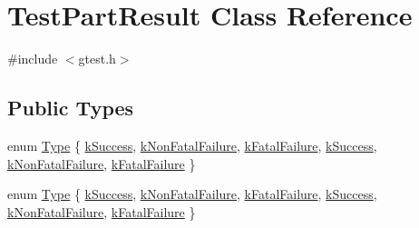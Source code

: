 \hypertarget{classtesting_1_1TestPartResult}{\section{\-Test\-Part\-Result \-Class \-Reference}
\label{d9/d98/classtesting_1_1TestPartResult}
}


{\ttfamily \#include $<$gtest.\-h$>$}

\subsection*{\-Public \-Types}
\begin{DoxyCompactItemize}
\item 
enum \hyperlink{classtesting_1_1TestPartResult_a1d1cfd8ffb84e947f82999c682b666a7}{\-Type} \{ \*
\hyperlink{classtesting_1_1TestPartResult_a1d1cfd8ffb84e947f82999c682b666a7a266017ca395108407d14b7be595574c1}{k\-Success}, 
\hyperlink{classtesting_1_1TestPartResult_a1d1cfd8ffb84e947f82999c682b666a7af063e8ea6a2c3b8bdccc62a49e1e27a7}{k\-Non\-Fatal\-Failure}, 
\hyperlink{classtesting_1_1TestPartResult_a1d1cfd8ffb84e947f82999c682b666a7a902a473edef7eeb3e0499901a220ecfd}{k\-Fatal\-Failure}, 
\hyperlink{classtesting_1_1TestPartResult_a1d1cfd8ffb84e947f82999c682b666a7a266017ca395108407d14b7be595574c1}{k\-Success}, 
\*
\hyperlink{classtesting_1_1TestPartResult_a1d1cfd8ffb84e947f82999c682b666a7af063e8ea6a2c3b8bdccc62a49e1e27a7}{k\-Non\-Fatal\-Failure}, 
\hyperlink{classtesting_1_1TestPartResult_a1d1cfd8ffb84e947f82999c682b666a7a902a473edef7eeb3e0499901a220ecfd}{k\-Fatal\-Failure}
 \}
\item 
enum \hyperlink{classtesting_1_1TestPartResult_a1d1cfd8ffb84e947f82999c682b666a7}{\-Type} \{ \*
\hyperlink{classtesting_1_1TestPartResult_a1d1cfd8ffb84e947f82999c682b666a7a266017ca395108407d14b7be595574c1}{k\-Success}, 
\hyperlink{classtesting_1_1TestPartResult_a1d1cfd8ffb84e947f82999c682b666a7af063e8ea6a2c3b8bdccc62a49e1e27a7}{k\-Non\-Fatal\-Failure}, 
\hyperlink{classtesting_1_1TestPartResult_a1d1cfd8ffb84e947f82999c682b666a7a902a473edef7eeb3e0499901a220ecfd}{k\-Fatal\-Failure}, 
\hyperlink{classtesting_1_1TestPartResult_a1d1cfd8ffb84e947f82999c682b666a7a266017ca395108407d14b7be595574c1}{k\-Success}, 
\*
\hyperlink{classtesting_1_1TestPartResult_a1d1cfd8ffb84e947f82999c682b666a7af063e8ea6a2c3b8bdccc62a49e1e27a7}{k\-Non\-Fatal\-Failure}, 
\hyperlink{classtesting_1_1TestPartResult_a1d1cfd8ffb84e947f82999c682b666a7a902a473edef7eeb3e0499901a220ecfd}{k\-Fatal\-Failure}
 \}
\end{DoxyCompactItemize}
